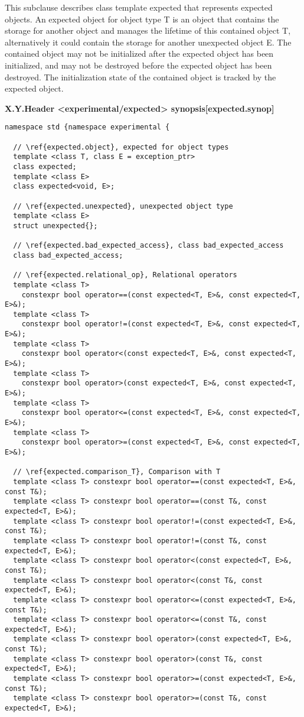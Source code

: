 \documentclass[a4paper,10pt]{article}
\newcounter{countWordingSubSec}
\renewcommand{\thecountWordingSubSec}{X.Y.\arabic{countWordingSubSec}}
\newcommand{\wordingSubSec}[2]{\vspace{15pt}
\refstepcounter{countWordingSubSec}
\noindent
{\textbf{\thecountWordingSubSec\quad #1\hfill\textbf{[#2]}}}
\label{#2}
\vspace{7pt}
}
\begin{document}
This subclause describes class template expected that represents expected objects. An expected object for object type T is an object that contains the storage for another object and manages the lifetime of this contained object T, alternatively it could contain the storage for another unexpected object E. The contained object may not be initialized after the expected object has been initialized, and may not be destroyed before the expected object has been destroyed. The initialization state of the contained object is tracked by the expected object.

\wordingSubSec{Header <experimental/expected> synopsis}{expected.synop}

\begin{lstlisting}
namespace std {namespace experimental {

  // \ref{expected.object}, expected for object types  
  template <class T, class E = exception_ptr>
  class expected;
  template <class E>
  class expected<void, E>;
  
  // \ref{expected.unexpected}, unexpected object type
  template <class E>
  struct unexpected{};
   
  // \ref{expected.bad_expected_access}, class bad_expected_access
  class bad_expected_access;
  
  // \ref{expected.relational_op}, Relational operators
  template <class T>
    constexpr bool operator==(const expected<T, E>&, const expected<T, E>&);
  template <class T>
    constexpr bool operator!=(const expected<T, E>&, const expected<T, E>&);
  template <class T>
    constexpr bool operator<(const expected<T, E>&, const expected<T, E>&);
  template <class T>
    constexpr bool operator>(const expected<T, E>&, const expected<T, E>&);
  template <class T>
    constexpr bool operator<=(const expected<T, E>&, const expected<T, E>&);
  template <class T>
    constexpr bool operator>=(const expected<T, E>&, const expected<T, E>&);
    
  // \ref{expected.comparison_T}, Comparison with T
  template <class T> constexpr bool operator==(const expected<T, E>&, const T&);
  template <class T> constexpr bool operator==(const T&, const expected<T, E>&);
  template <class T> constexpr bool operator!=(const expected<T, E>&, const T&);
  template <class T> constexpr bool operator!=(const T&, const expected<T, E>&);
  template <class T> constexpr bool operator<(const expected<T, E>&, const T&);
  template <class T> constexpr bool operator<(const T&, const expected<T, E>&);
  template <class T> constexpr bool operator<=(const expected<T, E>&, const T&);
  template <class T> constexpr bool operator<=(const T&, const expected<T, E>&);
  template <class T> constexpr bool operator>(const expected<T, E>&, const T&);
  template <class T> constexpr bool operator>(const T&, const expected<T, E>&);
  template <class T> constexpr bool operator>=(const expected<T, E>&, const T&);
  template <class T> constexpr bool operator>=(const T&, const expected<T, E>&);


\end{lstlisting}
\end{document}
